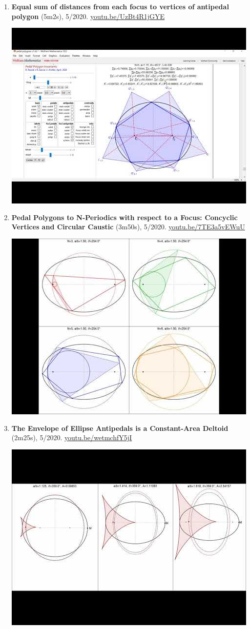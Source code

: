 \documentclass[12pt]{article}
\begin{document}
\begin{enumerate}[resume]
\item \textbf{Equal sum of distances from each focus to vertices of antipedal polygon} (5m2s), 5/2020. \href{https://youtu.be/UzBt4R1jGYE}{\url{youtu.be/UzBt4R1jGYE}}
\begin{center}\includegraphics[width=.5\textwidth]{pics/UzBt4R1jGYE.jpg}\end{center}
% 
\item \textbf{Pedal Polygons to N-Periodics with respect to a Focus: Concyclic Vertices and Circular Caustic} (3m50s), 5/2020. \href{https://youtu.be/7TE3a5vEWuU}{\url{youtu.be/7TE3a5vEWuU}}
\begin{center}\includegraphics[width=.5\textwidth]{pics/7TE3a5vEWuU.jpg}\end{center}
% 
\item \textbf{The Envelope of Ellipse Antipedals is a Constant-Area Deltoid} (2m25s), 5/2020. \href{https://youtu.be/wetmchfY5jI}{\url{youtu.be/wetmchfY5jI}}
\begin{center}\includegraphics[width=.5\textwidth]{pics/wetmchfY5jI.jpg}\end{center}

\end{enumerate}
\end{document}
